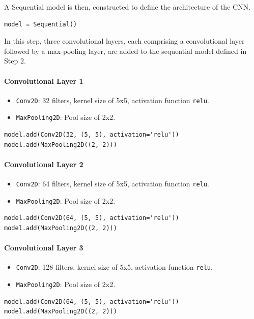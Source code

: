 \begin{step}
A Sequential model is then, constructed to define the architecture of the CNN.
\begin{verbatim}
model = Sequential()
\end{verbatim}
\end{step}
\begin{step}
In this step, three convolutional layers, each comprising a convolutional layer followed by a max-pooling layer, are added to the sequential model defined in Step 2.
\paragraph*{Convolutional Layer 1}
\begin{itemize}
    \item \texttt{Conv2D}: 32 filters, kernel size of 5x5, activation function \texttt{relu}.
    \item \texttt{MaxPooling2D}: Pool size of 2x2.
\end{itemize}
\begin{verbatim}
model.add(Conv2D(32, (5, 5), activation='relu'))
model.add(MaxPooling2D((2, 2)))
\end{verbatim}

\paragraph*{Convolutional Layer 2}
\begin{itemize}
    \item \texttt{Conv2D}: 64 filters, kernel size of 5x5, activation function \texttt{relu}.
    \item \texttt{MaxPooling2D}: Pool size of 2x2.
\end{itemize}
\begin{verbatim}
model.add(Conv2D(64, (5, 5), activation='relu'))
model.add(MaxPooling2D((2, 2)))
\end{verbatim}

\paragraph*{Convolutional Layer 3}
\begin{itemize}
    \item \texttt{Conv2D}: 128 filters, kernel size of 5x5, activation function \texttt{relu}.
    \item \texttt{MaxPooling2D}: Pool size of 2x2.
\end{itemize}
\begin{verbatim}
model.add(Conv2D(64, (5, 5), activation='relu'))
model.add(MaxPooling2D((2, 2)))
\end{verbatim}
\end{step}

